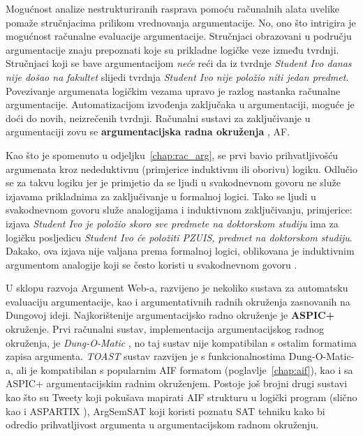 Mogućnost analize nestrukturiranih rasprava pomoću
računalnih alata uvelike pomaže stručnjacima prilikom 
vrednovanja argumentacije. No, ono što intrigira je 
mogućnost računalne evaluacije argumentacije. 
Stručnjaci obrazovani u području argumentacije znaju prepoznati
koje su prikladne logičke veze između tvrdnji.   
Stručnjaci koji se bave argumentacijom \emph{neće} reći da iz tvrdnje
\emph{Student Ivo danas nije došao na fakultet} slijedi
tvrdnja \emph{Student Ivo nije položio niti jedan predmet}.
Povezivanje argumenata logičkim vezama upravo je
razlog nastanka računalne argumentacije. 
Automatizacijom izvođenja zaključaka u argumentaciji,
moguće je doći do novih, neizrečenih tvrdnji.
Računalni sustavi za zaključivanje u argumentaciji zovu se 
\textbf{argumentacijska radna okruženja} , \@{AF}.

Kao što je spomenuto u odjeljku~\ref{chap:rac_arg},
\cite{dung1995acceptability} se prvi bavio 
prihvatljivošću argumenata  
kroz nededuktivnu (primjerice induktivnu ili oborivu) logiku.
Odlučio se za takvu logiku jer je primjetio da se ljudi u svakodnevnom 
govoru ne služe izjavama prikladnima za zaključivanje u formalnoj logici. 
Tako se ljudi u svakodnevnom govoru služe analogijama i induktivnom zaključivanju, 
primjerice: izjava \emph{Student Ivo je položio skoro sve predmete na doktorskom studiju} 
ima za logičku posljedicu \emph{Student Ivo će položiti PZUIS, predmet na doktorskom studiju}. 
Dakako, ova izjava nije valjana prema formalnoj logici, oblikovana je
induktivnim argumentom analogije koji se često koristi u svakodnevnom govoru 
\citep{juthe2005argument}.

U sklopu razvoja Argument Web-a, razvijeno je nekoliko sustava za
automatsku evaluaciju argumentacije, kao i argumentativnih radnih okruženja
zasnovanih na Dungovoj ideji. Najkorištenije argumentacijsko radno okruženje
je \textbf{ASPIC+} okruženje. 
Prvi računalni sustav, implementacija argumentacijskog radnog okruženja, 
je \emph{Dung-O-Matic} \citep{snaith2010pipelining},
no taj sustav nije kompatibilan s ostalim formatima zapisa argumenta. 
\emph{TOAST} sustav razvijen je s funkcionalnostima Dung-O-Matic-a, ali 
je kompatibilan s popularnim AIF formatom (poglavlje~\ref{chap:aif}), kao i sa 
ASPIC+ argumentacijskim radnim okruženjem. 
Postoje još brojni drugi sustavi kao što su Tweety \citep{thimm2014tweety} koji
pokušava mapirati AIF strukturu u logički program 
(slično kao i ASPARTIX \citep{egly2008aspartix}),
ArgSemSAT \citep{cerutti2014argsemsat}
koji koristi poznatu SAT \citep{moskewicz2001chaff}
 tehniku kako bi odredio prihvatljivost argumenta
u argumentacijskom radnom okruženju.

